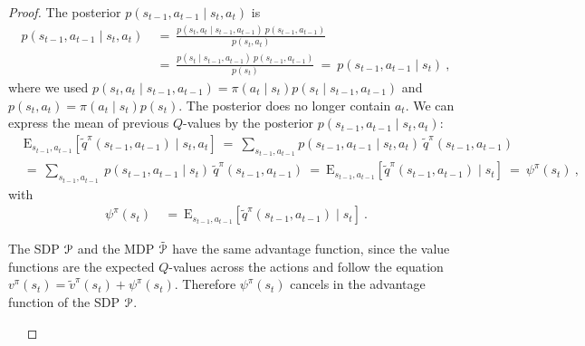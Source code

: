 \documentclass{article}
\newcommand\EXP{\mathbf{\mathrm{E}}}
\begin{document}
\begin{appendices}
\begin{proof}
The posterior  $p(s_{t-1},a_{t-1} \mid s_t, a_t)$ is
\begin{align}
 p(s_{t-1},a_{t-1} \mid s_t, a_t)  \ &= \
  \frac{ p(s_t,a_t \mid s_{t-1}, a_{t-1}) \ p(s_{t-1},a_{t-1})}{
    p(s_t,a_t)} \\ \nonumber
  &= \  \frac{ p(s_t \mid s_{t-1}, a_{t-1}) \ p(s_{t-1},a_{t-1})}{
    p(s_t)}  \ = \ p(s_{t-1},a_{t-1} \mid s_t )  \ ,
\end{align} 
where we used $p(s_t,a_t \mid s_{t-1}, a_{t-1}) = \pi(a_t \mid s_t)
p(s_t \mid s_{t-1}, a_{t-1})$ and  $p(s_t,a_t)= \pi(a_t \mid s_t) p(s_t)$.
The posterior does no longer contain $a_t$.
We can express the mean of previous $Q$-values
by the posterior  $p(s_{t-1},a_{t-1} \mid s_t, a_t)$:
\begin{align}
  &\EXP_{s_{t-1},a_{t-1}} \left[ \tilde{q}^\pi(s_{t-1},a_{t-1}) \mid s_t, a_t \right] \ = \ 
  \sum_{s_{t-1},a_{t-1}} p(s_{t-1},a_{t-1} \mid s_t, a_t) \
  \tilde{q}^\pi(s_{t-1},a_{t-1}) \\ \nonumber
  &= \ \sum_{s_{t-1},a_{t-1}} 
   \ p(s_{t-1},a_{t-1} \mid s_t ) \
  \tilde{q}^\pi(s_{t-1},a_{t-1}) \ = \  
   \EXP_{s_{t-1},a_{t-1}} \left[ \tilde{q}^\pi(s_{t-1},a_{t-1}) \mid s_t \right]
   \ = \ \psi^\pi(s_t) \ , 
\end{align} 
with 
\begin{align}
  \psi^\pi(s_t) \ &= \
  \EXP_{s_{t-1},a_{t-1}} \left[ \tilde{q}^\pi(s_{t-1},a_{t-1}) \mid s_t \right] \ .
\end{align} 


The SDP $\mathcal{P}$ and the MDP
$\tilde{\mathcal{P}}$ have the same advantage function, 
since the value functions are the expected $Q$-values across the actions
and follow the equation $v^\pi(s_t) = \tilde{v}^\pi(s_t)+\psi^\pi(s_t)$.
Therefore $\psi^\pi(s_t)$ cancels in the advantage function of the SDP $\mathcal{P}$. 


~~\newline


\end{proof}
\end{appendices}
\end{document}
